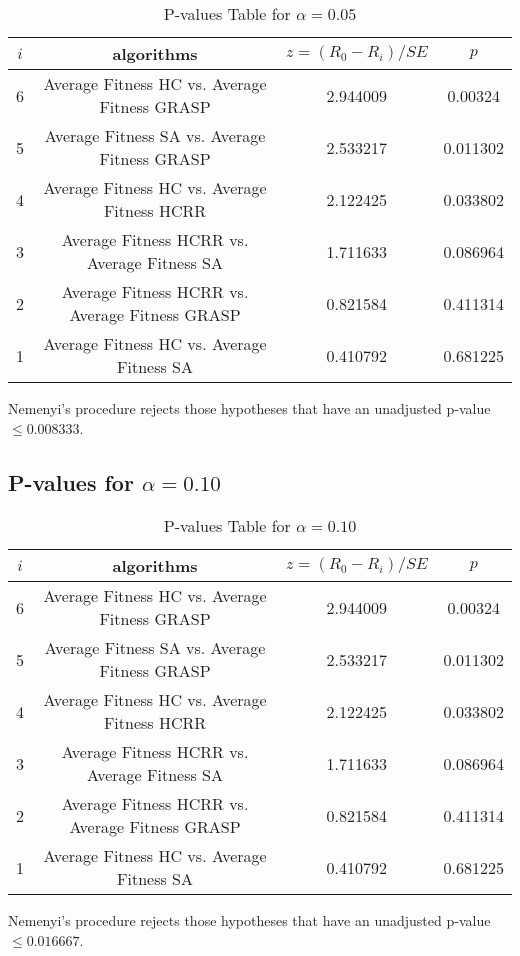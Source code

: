 \documentclass[a4paper,10pt]{article}
\begin{document}
\begin{landscape}
\begin{table}[!htp]
\centering\scriptsize
\begin{tabular}{cccc}
$i$&algorithms&$z=(R_0 - R_i)/SE$&$p$\\
\hline6&Average Fitness HC       vs. Average Fitness GRASP&2.944009&0.00324\\
5&Average Fitness SA      vs. Average Fitness GRASP&2.533217&0.011302\\
4&Average Fitness HC       vs. Average Fitness HCRR   &2.122425&0.033802\\
3&Average Fitness HCRR    vs. Average Fitness SA     &1.711633&0.086964\\
2&Average Fitness HCRR    vs. Average Fitness GRASP&0.821584&0.411314\\
1&Average Fitness HC       vs. Average Fitness SA     &0.410792&0.681225\\
\hline
\end{tabular}
\caption{P-values Table for $\alpha=0.05$}
\end{table}Nemenyi's procedure rejects those hypotheses that have an unadjusted p-value $\le0.008333$.

\pagebreak

\subsection{P-values for $\alpha=0.10$}

\begin{table}[!htp]
\centering\scriptsize
\begin{tabular}{cccc}
$i$&algorithms&$z=(R_0 - R_i)/SE$&$p$\\
\hline6&Average Fitness HC       vs. Average Fitness GRASP&2.944009&0.00324\\
5&Average Fitness SA      vs. Average Fitness GRASP&2.533217&0.011302\\
4&Average Fitness HC       vs. Average Fitness HCRR   &2.122425&0.033802\\
3&Average Fitness HCRR    vs. Average Fitness SA     &1.711633&0.086964\\
2&Average Fitness HCRR    vs. Average Fitness GRASP&0.821584&0.411314\\
1&Average Fitness HC       vs. Average Fitness SA     &0.410792&0.681225\\
\hline
\end{tabular}
\caption{P-values Table for $\alpha=0.10$}
\end{table}Nemenyi's procedure rejects those hypotheses that have an unadjusted p-value $\le0.016667$.


\end{landscape}
\end{document}
